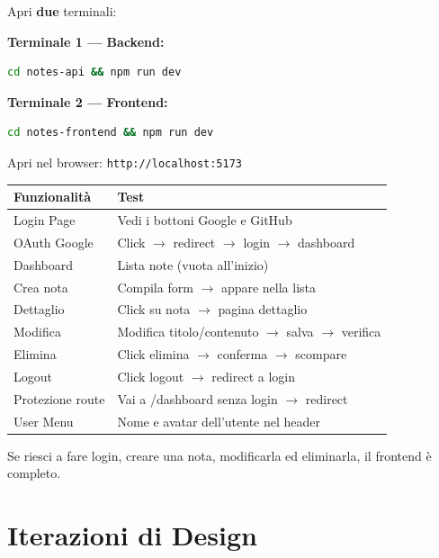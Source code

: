 \begin{praticabox}[title={Pratica --- Avvio}]
Apri \textbf{due} terminali:

\textbf{Terminale 1 --- Backend:}
\begin{lstlisting}[language=bash]
cd notes-api && npm run dev
\end{lstlisting}

\textbf{Terminale 2 --- Frontend:}
\begin{lstlisting}[language=bash]
cd notes-frontend && npm run dev
\end{lstlisting}

Apri nel browser: \texttt{http://localhost:5173}
\end{praticabox}

\begin{center}
\begin{tabularx}{\textwidth}{l X}
\toprule
\textbf{Funzionalità} & \textbf{Test} \\
\midrule
Login Page & Vedi i bottoni Google e GitHub \\
OAuth Google & Click $\rightarrow$ redirect $\rightarrow$ login $\rightarrow$ dashboard \\
Dashboard & Lista note (vuota all'inizio) \\
Crea nota & Compila form $\rightarrow$ appare nella lista \\
Dettaglio & Click su nota $\rightarrow$ pagina dettaglio \\
Modifica & Modifica titolo/contenuto $\rightarrow$ salva $\rightarrow$ verifica \\
Elimina & Click elimina $\rightarrow$ conferma $\rightarrow$ scompare \\
Logout & Click logout $\rightarrow$ redirect a login \\
Protezione route & Vai a /dashboard senza login $\rightarrow$ redirect \\
User Menu & Nome e avatar dell'utente nel header \\
\bottomrule
\end{tabularx}
\end{center}

\begin{checkpointbox}
Se riesci a fare login, creare una nota, modificarla ed eliminarla, il frontend è completo.
\end{checkpointbox}

\section{Iterazioni di Design}

